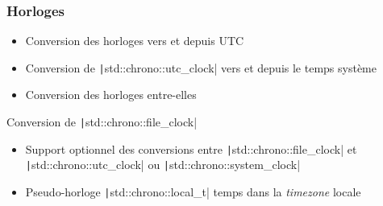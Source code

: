 \documentclass[C++.tex]{subfiles}
\begin{document}
\begin{frame}[fragile]

\end{frame}

\begin{frame}[fragile]
	\frametitle{Horloges}
	\begin{itemize}
		\item Conversion des horloges vers et depuis UTC
		\item Conversion de \texttt|std::chrono::utc_clock| vers et depuis le temps système
		\item Conversion des horloges entre-elles
	\end{itemize}

	\begin{alertblock}{Conversion de \texttt|std::chrono::file_clock|}
		\begin{itemize}
			\item Support optionnel des conversions entre \texttt|std::chrono::file_clock| et \texttt|std::chrono::utc_clock| ou \texttt|std::chrono::system_clock|
		\end{itemize}
	\end{alertblock}

	\begin{itemize}
		\item Pseudo-horloge \texttt|std::chrono::local_t| temps dans la \textit{timezone} locale
	\end{itemize}
\end{frame}
\end{document}

